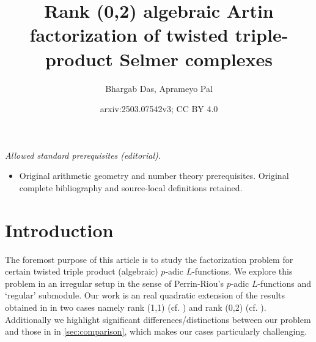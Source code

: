 \documentclass[10pt]{amsart}
\title{Rank (0,2) algebraic Artin factorization of twisted triple-product Selmer complexes}
\author{Bhargab Das, Aprameyo Pal}
\date{arxiv:2503.07542v3; CC BY 4.0}
\numberwithin{equation}{section}
\theoremstyle{definition}
\theoremstyle{remark} %
\begin{document}
\maketitle
\noindent\textit{Allowed standard prerequisites (editorial).}\begin{itemize}
\item Original arithmetic geometry and number theory prerequisites. Original complete bibliography and source-local definitions retained.
\end{itemize}\medskip
	\section{Introduction}
	\label{section:intro}
	The foremost purpose of this article is to study the factorization problem for certain twisted triple product (algebraic) $ p $-adic $ L $-functions. We explore this problem in an irregular setup in the sense of Perrin-Riou's $ p $-adic $ L $-functions and \enquote*{regular} submodule. Our work is an real quadratic extension of the results obtained in \cite{BCS23} in two cases namely rank (1,1) (cf. \cite[.2]{Darmon16GenralisedKatoClasses}) and rank (0,2) (cf. \cite[.3]{Darmon16GenralisedKatoClasses}). Additionally we highlight significant differences/distinctions between our problem and those in \cite{Greenberg1982,Palva18} in \textsection \ref{sec:comparison}, which makes our cases particularly challenging. 
	
\end{document}
